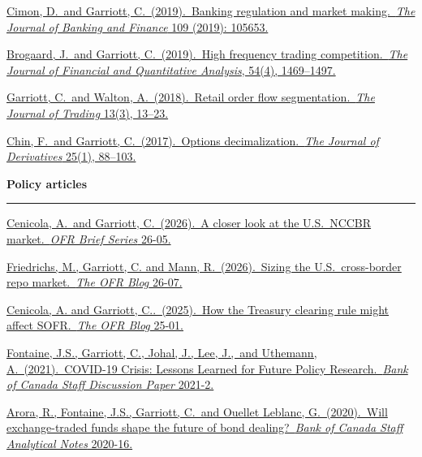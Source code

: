 \documentclass[11pt,letterpaper]{article}
\begin{document}
\bigskip
\noindent \href{https://www.sciencedirect.com/science/article/pii/S0378426619302286/pdfft?md5=eb08ac3526a322089c054fb7a69b4559&pid=1-s2.0-S0378426619302286-main.pdf}{Cimon, D.~and Garriott, C.~(2019).~Banking regulation and market making.~\textit{The Journal of Banking and Finance} 109 (2019): 105653.}

\bigskip
\noindent \href{https://www.cambridge.org/core/services/aop-cambridge-core/content/view/C6F1849FCA91D1B52AABA10F2A952D7B/S0022109018001175a.pdf/highfrequency_trading_competition.pdf}{Brogaard, J.~and Garriott, C.~(2019).~High frequency trading competition.~\textit{The Journal of Financial and Quantitative Analysis}, 54(4), 1469--1497.}

\bigskip
\noindent \href{https://www.bankofcanada.ca/2016/04/staff-working-paper-2016-20/}{Garriott, C.~and Walton, A.~(2018).~Retail order flow segmentation.~\textit{The Journal of Trading} 13(3), 13--23.}

\bigskip
\noindent \href{https://www.bankofcanada.ca/2016/12/staff-working-paper-2016-57/}{Chin, F.~and Garriott, C.~(2017).~Options decimalization.~\textit{The Journal of Derivatives} 25(1), 88--103.}

\bigskip
\noindent \textbf{Policy articles}
\hrule
\medskip

\noindent
\href{https://www.financialresearch.gov/briefs/2026/08/18/closer-look-us-nccbr-market/}{Cenicola, A.~and Garriott, C.~(2026).~A closer look at the U.S.~NCCBR market.~\textit{OFR Brief Series} 26-05.}

\bigskip
\noindent
\href{https://www.financialresearch.gov/the-ofr-blog/2026/04/09/sizing-the-us-cross-border-repo-market/}{Friedrichs, M., Garriott, C. and Mann, R.~(2026).~Sizing the U.S.~cross-border repo market.~\textit{The OFR Blog} 26-07.}

\bigskip
\noindent
\href{https://www.financialresearch.gov/the-ofr-blog/2025/04/22/how-the-treasury-clearing-rule-for-repo-might-affect-sofr/}{Cenicola, A. and Garriott, C..~(2025).~How the Treasury clearing rule might affect SOFR.~\textit{The OFR Blog} 25-01.}

\bigskip
\noindent
\href{https://www.bankofcanada.ca/2021/02/staff-discussion-paper-2021-2/}{Fontaine, J.S., Garriott, C., Johal, J., Lee, J.,~and Uthemann, A.~(2021).~COVID-19 Crisis: Lessons Learned for Future Policy Research.~\textit{Bank of Canada Staff Discussion Paper} 2021-2.}

\bigskip
\noindent \href{https://www.bankofcanada.ca/2020/07/staff-analytical-note-2020-16/}{Arora, R., Fontaine, J.S., Garriott, C.~and Ouellet Leblanc, G.~(2020).~Will exchange-traded funds shape the future of bond dealing?~\textit{Bank of Canada Staff Analytical Notes} 2020-16.}
\end{document}
